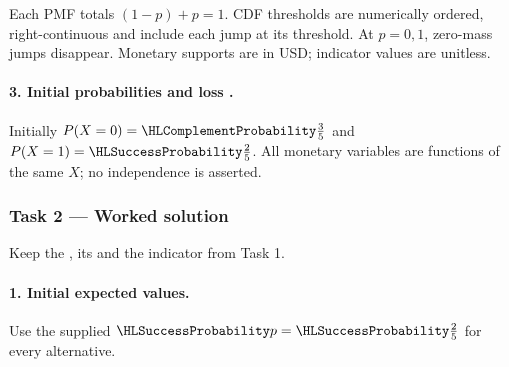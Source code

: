 Each PMF totals $(1-p)+p=1$. CDF thresholds are numerically ordered,
right-continuous and include each jump at its threshold. At $p=0,1$, zero-mass jumps disappear.
Monetary supports are in USD; indicator values are unitless.
\paragraph{3. Initial probabilities and loss \protect{}.}
Initially $P(X=0)=\FailureProb{\frac{3}{5}}$ and $P(X=1)=\SuccessProb{\frac{2}{5}}$.
All monetary variables are functions of the same $X$; no independence is asserted.
\clearpage\subsubsection*{Task 2 --- Worked solution}\label{sol:c3-inventory-decision}
Keep the , its  and the indicator from Task 1.
\paragraph{1. Initial expected values.}
Use the supplied $\SuccessProb{p}=\SuccessProb{\frac{2}{5}}$ for every alternative.
